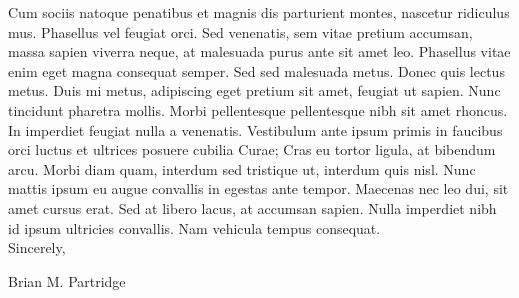 \documentclass[11pt]{article}
\begin{document}
Cum sociis natoque penatibus et magnis dis parturient montes, nascetur ridiculus mus. Phasellus vel feugiat orci. Sed venenatis, sem vitae pretium accumsan, massa sapien viverra neque, at malesuada purus ante sit amet leo. Phasellus vitae enim eget magna consequat semper. Sed sed malesuada metus. Donec quis lectus metus. Duis mi metus, adipiscing eget pretium sit amet, feugiat ut sapien. Nunc tincidunt pharetra mollis. Morbi pellentesque pellentesque nibh sit amet rhoncus. In imperdiet feugiat nulla a venenatis. Vestibulum ante ipsum primis in faucibus orci luctus et ultrices posuere cubilia Curae; Cras eu tortor ligula, at bibendum arcu. Morbi diam quam, interdum sed tristique ut, interdum quis nisl. Nunc mattis ipsum eu augue convallis in egestas ante tempor. Maecenas nec leo dui, sit amet cursus erat. Sed at libero lacus, at accumsan sapien. Nulla imperdiet nibh id ipsum ultricies convallis. Nam vehicula tempus consequat.\\


\noindent Sincerely,

\vspace*{44pt}
\noindent Brian M. Partridge
\end{document}
